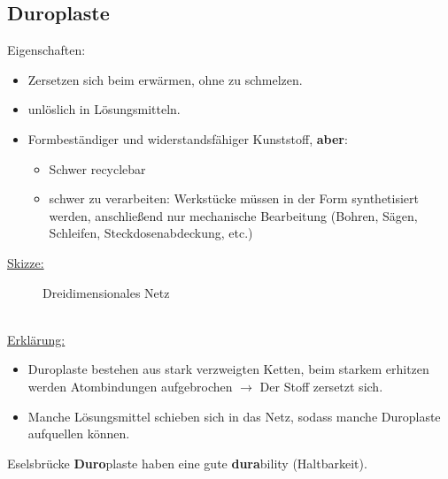 \documentclass[../../main.tex]{subfiles}
\begin{document}
\subsection{Duroplaste}
Eigenschaften:
\begin{itemize}
    \item Zersetzen sich beim erwärmen, ohne zu schmelzen.
    \item unlöslich in Lösungsmitteln.
    \item Formbeständiger und widerstandsfähiger Kunststoff, \textbf{aber}:
        \begin{itemize}
            \item Schwer recyclebar
            \item schwer zu verarbeiten: Werkstücke müssen in der Form
                synthetisiert werden, anschließend nur mechanische Bearbeitung
                (Bohren, Sägen, Schleifen, Steckdosenabdeckung, etc.)
        \end{itemize}
\end{itemize}
\underline{Skizze:}
\begin{figure}[ht]
    \centering
    \caption{Dreidimensionales Netz}
    \label{fig:skizze_duroplaste}
\end{figure}
%
\\
\underline{Erklärung:}
\begin{itemize}
    \item Duroplaste bestehen aus stark verzweigten Ketten, beim starkem
        erhitzen werden Atombindungen aufgebrochen $\rightarrow$ Der Stoff
        zersetzt sich. 
    \item  Manche Lösungsmittel schieben sich in das Netz, sodass manche
        Duroplaste aufquellen können.
\end{itemize}
\begin{merke}{Eselsbrücke}
    \textbf{Duro}plaste haben eine gute \textbf{dura}bility (Haltbarkeit).
\end{merke}
%
%
\end{document}
